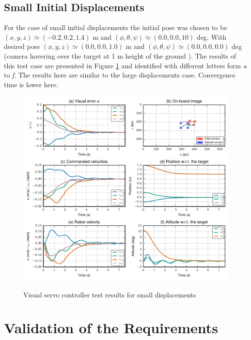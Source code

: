 \subsection{Small Initial Displacements}
\label{sec:small-initial-displacements}

For the case of small initial displacements the initial pose was chosen to be $(x, y, z) \simeq (-0.2, 0.2, 1.4)$ m and $(\phi, \theta, \psi) \simeq (0.0, 0.0, 10)$ deg. With desired pose $(x, y, z) \simeq (0.0, 0.0, 1.0)$ m and $(\phi, \theta, \psi) \simeq (0.0, 0.0, 0.0)$ deg (camera hovering over the target at 1 m height of the ground ). The results of this test case are presented in Figure \ref{fig:small-displacements} and identified with different letters form \emph{a} to \emph{f}. The results here are similar to the large displacements case. Convergence time is lower here.

\begin{figure}[!htb]
	\caption{Visual servo controller test results for small displacements}
	\centering
	\includegraphics[width=\textwidth]{content/chapter_06/images/exp_017_plot.pdf}
	\label{fig:small-displacements}
\end{figure}

\section{Validation of the Requirements}
\label{sec:requirements-validation}


